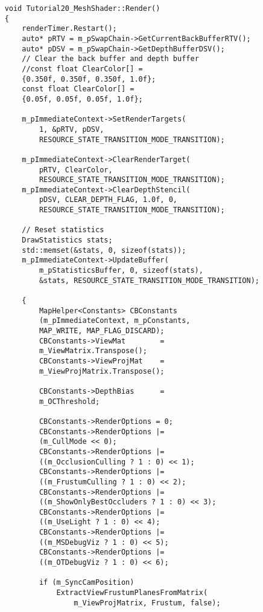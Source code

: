 \begin{lstlisting}
    void Tutorial20_MeshShader::Render()
    {
        renderTimer.Restart();
        auto* pRTV = m_pSwapChain->GetCurrentBackBufferRTV();
        auto* pDSV = m_pSwapChain->GetDepthBufferDSV();
        // Clear the back buffer and depth buffer
        //const float ClearColor[] = 
        {0.350f, 0.350f, 0.350f, 1.0f};
        const float ClearColor[] = 
        {0.05f, 0.05f, 0.05f, 1.0f};
        
        m_pImmediateContext->SetRenderTargets(
            1, &pRTV, pDSV, 
            RESOURCE_STATE_TRANSITION_MODE_TRANSITION);

        m_pImmediateContext->ClearRenderTarget(
            pRTV, ClearColor, 
            RESOURCE_STATE_TRANSITION_MODE_TRANSITION);
        m_pImmediateContext->ClearDepthStencil(
            pDSV, CLEAR_DEPTH_FLAG, 1.0f, 0, 
            RESOURCE_STATE_TRANSITION_MODE_TRANSITION);

        // Reset statistics
        DrawStatistics stats;
        std::memset(&stats, 0, sizeof(stats));
        m_pImmediateContext->UpdateBuffer(
            m_pStatisticsBuffer, 0, sizeof(stats), 
            &stats, RESOURCE_STATE_TRANSITION_MODE_TRANSITION);
    
        {
            MapHelper<Constants> CBConstants
            (m_pImmediateContext, m_pConstants, 
            MAP_WRITE, MAP_FLAG_DISCARD);
            CBConstants->ViewMat        = 
            m_ViewMatrix.Transpose();
            CBConstants->ViewProjMat    = 
            m_ViewProjMatrix.Transpose();

            CBConstants->DepthBias      = 
            m_OCThreshold;
            
            CBConstants->RenderOptions = 0;
            CBConstants->RenderOptions |= 
            (m_CullMode << 0);
            CBConstants->RenderOptions |= 
            ((m_OcclusionCulling ? 1 : 0) << 1);
            CBConstants->RenderOptions |= 
            ((m_FrustumCulling ? 1 : 0) << 2);
            CBConstants->RenderOptions |= 
            ((m_ShowOnlyBestOccluders ? 1 : 0) << 3);
            CBConstants->RenderOptions |= 
            ((m_UseLight ? 1 : 0) << 4);
            CBConstants->RenderOptions |= 
            ((m_MSDebugViz ? 1 : 0) << 5);
            CBConstants->RenderOptions |= 
            ((m_OTDebugViz ? 1 : 0) << 6);

            if (m_SyncCamPosition)
                ExtractViewFrustumPlanesFromMatrix(
                    m_ViewProjMatrix, Frustum, false);
    

\end{lstlisting}
